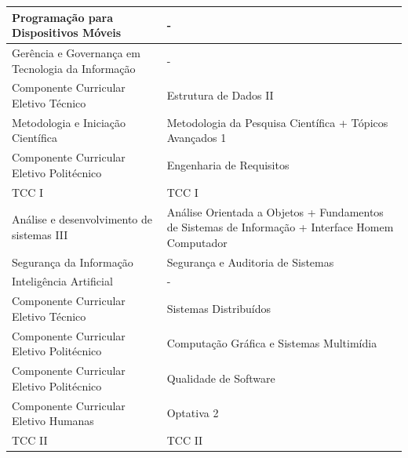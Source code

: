 \documentclass[11pt,fleqn]{book} %
\begin{document}
\begin{table}[H]
{\begin{tabular}{|l|l|}
			Programação para Dispositivos Móveis      & -                                                                                                \\ \hline
			Gerência e Governança em Tecnologia da Informação                & -                                                                                                \\ \hline
			Componente Curricular Eletivo Técnico     & Estrutura de Dados II                                                                            \\ \hline
			Metodologia e Iniciação Científica        & Metodologia da Pesquisa Científica + Tópicos Avançados 1                                         \\ \hline
			Componente Curricular Eletivo Politécnico & Engenharia de Requisitos                                                                         \\ \hline
			TCC I                                     & TCC I                                                                                            \\ \hline
			Análise e desenvolvimento de sistemas III & Análise Orientada a Objetos + Fundamentos de Sistemas de Informação + Interface Homem Computador \\ \hline
			Segurança da Informação                   & Segurança e Auditoria de Sistemas                                                                \\ \hline
			Inteligência Artificial                   & -                                                                                                \\ \hline
			Componente Curricular Eletivo Técnico     & Sistemas Distribuídos                                                                            \\ \hline
			Componente Curricular Eletivo Politécnico & Computação Gráfica e Sistemas Multimídia                                                         \\ \hline
			Componente Curricular Eletivo Politécnico & Qualidade de Software                                                                            \\ \hline
			Componente Curricular Eletivo Humanas     & Optativa 2                                                                                       \\ \hline
			TCC II                                    & TCC II                                                                                           \\ \hline
		\end{tabular}%
	}
\end{table}
\end{document}
